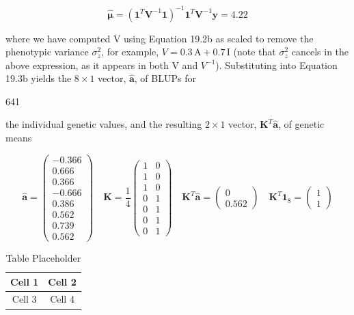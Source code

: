 \documentclass{article}
\begin{document}
\begin{equation}
\hat{\boldsymbol{\mu}}=\left(\mathbf{1}^{T}\mathbf{V}^{-1}\mathbf{1}\right)^{-1}\mathbf{1}^{T}\mathbf{V}^{-1}\mathbf{y}=4.22
\end{equation}

where we have computed V using Equation 19.2b as scaled to remove the phenotypic variance  $ \sigma_{z}^{2} $, for example,  $ V = 0.3 \, \text{A} + 0.7 \, \text{I} $ (note that  $ \sigma_{z}^{2} $ cancels in the above expression, as it appears in both V and  $ V^{-1} $). Substituting into Equation 19.3b yields the  $ 8 \times 1 $ vector,  $ \widehat{\mathbf{a}} $, of BLUPs for

641

the individual genetic values, and the resulting  $ 2 \times 1 $ vector,  $ \mathbf{K}^T \widehat{\mathbf{a}} $, of genetic means

\begin{equation}
\widehat{\mathbf{a}}=\begin{pmatrix}{{{-0.366}}} \\{{{0.666}}} \\{{{0.366}}} \\{{{-0.666}}} \\{{{0.386}}} \\{{{0.562}}} \\{{{0.739}}} \\{{{0.562}}}\end{pmatrix}\quad\mathbf{K}=\frac{1}{4}\begin{pmatrix}{{{1}}}&{{{0}}} \\{{{1}}}&{{{0}}} \\{{{1}}}&{{{0}}} \\{{{0}}}&{{{1}}} \\{{{0}}}&{{{1}}} \\{{{0}}}&{{{1}}} \\{{{0}}}&{{{1}}}\end{pmatrix}\quad\mathbf{K}^{T}\widehat{\mathbf{a}}=\begin{pmatrix}{{{0}}} \\{{{0.562}}}\end{pmatrix}\quad\mathbf{K}^{T}\mathbf{1}_{8}=\begin{pmatrix}{{{1}}} \\{{{1}}}\end{pmatrix}
\end{equation}

\begin{table}[h]
\centering
\begin{tabular}{|c|c|}
\hline
Cell 1 & Cell 2 \\
\hline
Cell 3 & Cell 4 \\
\hline
\end{tabular}
\caption{Table Placeholder}
\end{table}
\end{document}

